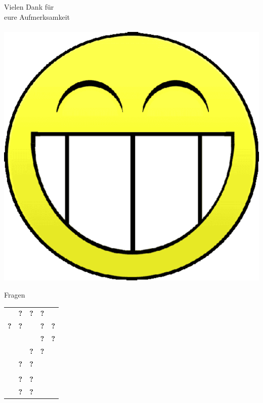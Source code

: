 \documentclass{beamer}
\begin{document}
\begin{frame}{}
  \begin{center}
    \begin{LARGE}
      Vielen Dank für\\
      eure Aufmerksamkeit\\
      ~\\
      \includegraphics[scale=0.2]{smilie.png}
    \end{LARGE}
  \end{center}
\end{frame}

\begin{frame}{Fragen}
  \begin{center}
    \begin{LARGE}
      \begin{tabular}{ccccc}
         & \textbf{?} & \textbf{?} & \textbf{?} & \\
        \textbf{?} & \textbf{?} &  & \textbf{?} & \textbf{?}\\
         &  &  & \textbf{?} & \textbf{?}\\
         &  & \textbf{?} & \textbf{?} & \\
         & \textbf{?} & \textbf{?} &  & \\
         &  &  &  & \\
         & \textbf{?} & \textbf{?} &  & \\
         & \textbf{?} & \textbf{?} &  & 
      \end{tabular}
    \end{LARGE}
  \end{center}
\end{frame}
\end{document}
